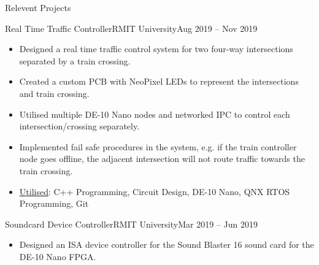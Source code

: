 \documentclass[]{mcdowellcv}
\begin{document}
\begin{cvsection}{Relevent Projects}
		\begin{cvsubsection}{Real Time Traffic Controller}{RMIT University}{Aug 2019 -- Nov 2019}
			\begin{itemize}
				\item Designed a real time traffic control system for two four-way intersections separated by a train crossing.
				\item Created a custom PCB with NeoPixel LEDs to represent the intersections and train crossing.
				\item Utilised multiple DE-10 Nano nodes and networked IPC to control each intersection/crossing separately.
				\item Implemented fail safe procedures in the system, e.g. if the train controller node goes offline, the adjacent intersection will not route traffic towards the train crossing.
				\item \underline{Utilised}: C++ Programming, Circuit Design, DE-10 Nano, QNX RTOS Programming, Git
			\end{itemize}
		\end{cvsubsection}
\iffalse
-Worked in a team of four to develop a real time traffic controller system for two four-way intersections separated by a train crossing.
-The intersections were represented by a custom PCB our team designed and created, utilising NeoPixel LEDs as our traffic lights and push buttons as our pedestrian buttons. 
-The system itself was controlled by four separate micro-controller nodes (DE-10 Nano) running the QNX real time operating system, one for each intersection, one for the train crossing and one more as the controlling/watchdog system. 
-Each node was heavily multi threaded and networked IPC was utilised to communicate between nodes. 
-Node failure was accounted for in the design, with fail safe mechanisms employed to stop potentially dangerous scenarios, e.g. if the train crossing controller node went offline, the adjacent intersections would not route traffic towards the crossing.
-The lights realistically change, transitioning from green to yellow to red in real time, with the transitions being triggered by either timers, or the pedestrian buttons depending on the mode.
-The controller node featured a command line interface, which allowed individual control over each other nodes mode, light configuration and timing. 
\fi
		\begin{cvsubsection}{Soundcard Device Controller}{RMIT University}{Mar 2019 -- Jun 2019}
			\begin{itemize}
				\item Designed an ISA device controller for the Sound Blaster 16 sound card for the DE-10 Nano FPGA.

\end{itemize}
\end{cvsubsection}
\end{cvsection}
\end{document}

